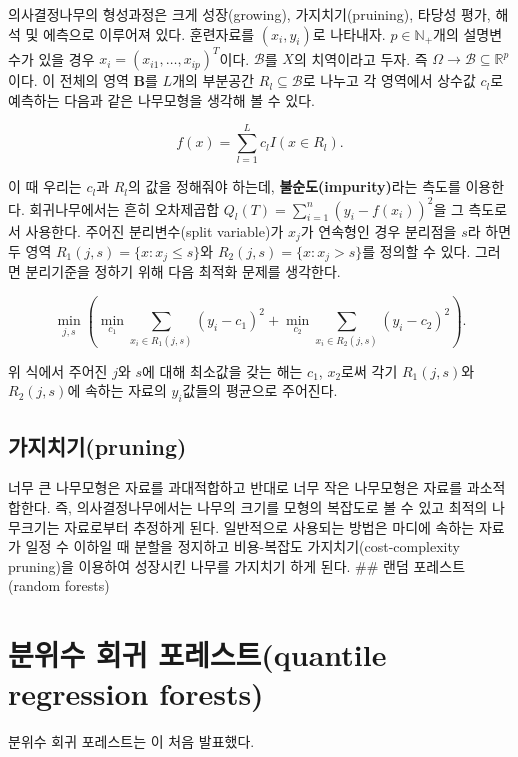 \documentclass[b5paper,]{scrbook}
\theoremstyle{plain}
\theoremstyle{definition}
\numberwithin{equation}{section}
\begin{document}
의사결정나무의 형성과정은 크게 성장(growing), 가지치기(pruining), 타당성
평가, 해석 및 에측으로 이루어져 있다. 훈련자료를 \((x_{i}, y_{i})\)로
나타내자. \(p \in \mathbb{N}_{+}\)개의 설명변수가 있을 경우
\(x_{i}=(x_{i1}, \ldots, x_{ip})^{T}\)이다. \(\mathcal{B}\)를 \(X\)의
치역이라고 두자. 즉
\(\Omega \rightarrow \mathcal{B} \subseteq \mathbb{R}^{p}\)이다. 이
전체의 영역 \(\mathbf{B}\)를 \(L\)개의 부분공간
\(R_{l}\subseteq \mathcal{B}\)로 나누고 각 영역에서 상수값 \(c_{l}\)로
예측하는 다음과 같은 나무모형을 생각해 볼 수 있다.

\[f(x)=\sum_{l=1}^{L}c_{l}I(x\in R_{l}).\]

이 때 우리는 \(c_{l}\)과 \(R_{l}\)의 값을 정해줘야 하는데,
\textbf{불순도(impurity)}라는 측도를 이용한다. 회귀나무에서는 흔히
오차제곱합 \(Q_{l}(T)=\sum_{i=1}^{n}(y_{i}-f(x_{i}))^{2}\)을 그 측도로서
사용한다. 주어진 분리변수(split variable)가 \(x_{j}\)가 연속형인 경우
분리점을 \(s\)라 하면 두 영역 \(R_{1}(j,s)=\{ x: x_{j} \leq s\}\)와
\(R_{2}(j,s)=\{ x: x_{j} > s\}\)를 정의할 수 있다. 그러면 분리기준을
정하기 위해 다음 최적화 문제를 생각한다.

\[\min_{j,s}(\min_{c_{1}}\sum_{x_{i}\in R_{1}(j,s)}(y_{i}-c_{1})^{2} + \min_{c_{2}}\sum_{x_{i}\in R_{2}(j,s)}(y_{i}-c_{2})^{2}).\]

위 식에서 주어진 \(j\)와 \(s\)에 대해 최소값을 갖는 해는 \(c_{1}\),
\(x_{2}\)로써 각기 \(R_{1}(j,s)\)와 \(R_{2}(j,s)\)에 속하는 자료의
\(y_{i}\)값들의 평균으로 주어진다.

\subsection{가지치기(pruning)}\label{pruning}

너무 큰 나무모형은 자료를 과대적합하고 반대로 너무 작은 나무모형은
자료를 과소적합한다. 즉, 의사결정나무에서는 나무의 크기를 모형의
복잡도로 볼 수 있고 최적의 나무크기는 자료로부터 추정하게 된다.
일반적으로 사용되는 방법은 마디에 속하는 자료가 일정 수 이하일 때 분할을
정지하고 비용-복잡도 가지치기(cost-complexity pruning)을 이용하여
성장시킨 나무를 가지치기 하게 된다. \#\# 랜덤 포레스트(random forests)

\section{분위수 회귀 포레스트(quantile regression
forests)}\label{--quantile-regression-forests}

분위수 회귀 포레스트는 \citep{Meinshausen2006}이 처음 발표했다.
\end{document}
